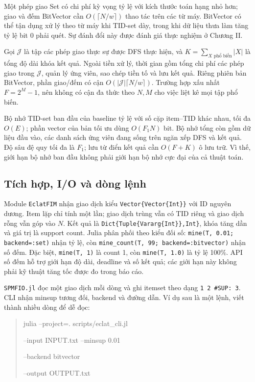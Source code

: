 Một phép giao Set có chi phí kỳ vọng tỷ lệ với kích thước toán hạng nhỏ hơn; giao và đếm BitVector cần $O(\lceil N/w\rceil)$ thao tác trên các từ máy. BitVector có thể tận dụng xử lý theo từ máy khi TID-set dày, trong khi dữ liệu thưa làm tăng tỷ lệ bit 0 phải quét. Sự đánh đổi này được đánh giá thực nghiệm ở Chương II.

Gọi $\mathcal{J}$ là tập các phép giao thực sự được DFS thực hiện, và $K=\sum_{X\text{ phổ biến}}|X|$ là tổng độ dài khóa kết quả. Ngoài tiền xử lý, thời gian gồm tổng chi phí các phép giao trong $\mathcal{J}$, quản lý ứng viên, sao chép tiền tố và lưu kết quả. Riêng phiên bản BitVector, phần giao/đếm có cận $O(|\mathcal{J}|\lceil N/w\rceil)$. Trường hợp xấu nhất $F=2^M-1$, nên không có cận đa thức theo $N,M$ cho việc liệt kê mọi tập phổ biến.

Bộ nhớ TID-set ban đầu của baseline tỷ lệ với số cặp item--TID khác nhau, tối đa $O(E)$; phần vector của bản tối ưu dùng $O(F_1N)$ bit. Bộ nhớ tổng còn gồm dữ liệu đầu vào, các danh sách ứng viên đang sống trên ngăn xếp DFS và kết quả. Độ sâu đệ quy tối đa là $F_1$; lưu từ điển kết quả cần $O(F+K)$ ô lưu trữ. Vì thế, giới hạn bộ nhớ ban đầu không phải giới hạn bộ nhớ cực đại của cả thuật toán.

\subsection{Tích hợp, I/O và dòng lệnh}
Module \texttt{EclatFIM} nhận giao dịch kiểu \texttt{Vector\{Vector\{Int\}\}} với ID nguyên dương. Item lặp chỉ tính một lần; giao dịch trùng vẫn có TID riêng và giao dịch rỗng vẫn góp vào $N$. Kết quả là \texttt{Dict\{Tuple\{Vararg\{Int\}\},Int\}}, khóa tăng dần và giá trị là support count. Julia phân phối theo kiểu đối số: \texttt{mine(T, 0.01; backend=:set)} nhận tỷ lệ, còn \texttt{mine\_count(T, 99; backend=:bitvector)} nhận số đếm. Đặc biệt, \texttt{mine(T, 1)} là count 1, còn \texttt{mine(T, 1.0)} là tỷ lệ 100\%. API số đếm hỗ trợ giới hạn độ dài, deadline và số kết quả; các giới hạn này không phải kỹ thuật tăng tốc được đo trong báo cáo.

\texttt{SPMFIO.jl} đọc một giao dịch mỗi dòng và ghi itemset theo dạng \texttt{1 2 \#SUP: 3}. CLI nhận minsup tương đối, backend và đường dẫn. Ví dụ sau là một lệnh, viết thành nhiều dòng để dễ đọc:
\begin{quote}\small\ttfamily
julia --project=. scripts/eclat\_cli.jl\par
\quad --input INPUT.txt --minsup 0.01\par
\quad --backend bitvector\par
\quad --output OUTPUT.txt
\end{quote}

